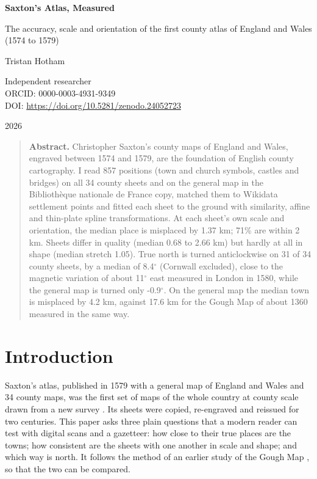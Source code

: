 \documentclass[11pt,a4paper]{article}
\begin{document}
\begin{center}
{\Large\bfseries Saxton's Atlas, Measured\par}
\vspace{0.4em}
{\large The accuracy, scale and orientation of the first county atlas of England and Wales (1574 to 1579)\par}
\vspace{1.2em}
{\large Tristan Hotham\par}
\vspace{0.3em}
{\small Independent researcher\\ ORCID: 0000-0003-4931-9349\\ DOI: \url{https://doi.org/10.5281/zenodo.24052723}\par}
\vspace{0.8em}
2026
\end{center}
\begin{quote}\small\textbf{Abstract.} Christopher Saxton's county maps of England and Wales, engraved between 1574 and 1579, are the foundation of English county cartography. I read 857 positions (town and church symbols, castles and bridges) on all 34 county sheets and on the general map in the Biblioth\`eque nationale de France copy, matched them to Wikidata settlement points and fitted each sheet to the ground with similarity, affine and thin-plate spline transformations. At each sheet's own scale and orientation, the median place is misplaced by 1.37 km; 71\% are within 2 km. Sheets differ in quality (median 0.68 to 2.66 km) but hardly at all in shape (median stretch 1.05). True north is turned anticlockwise on 31 of 34 county sheets, by a median of 8.4$^\circ$ (Cornwall excluded), close to the magnetic variation of about 11\textonequarter$^\circ$ east measured in London in 1580, while the general map is turned only -0.9$^\circ$. On the general map the median town is misplaced by 4.2 km, against 17.6 km for the Gough Map of about 1360 measured in the same way.\end{quote}

\section{Introduction}
Saxton's atlas, published in 1579 with a general map of England and Wales and 34 county maps, was the first set of maps of the whole country at county scale drawn from a new survey \citep{evans}. Its sheets were copied, re-engraved and reissued for two centuries. This paper asks three plain questions that a modern reader can test with digital scans and a gazetteer: how close to their true places are the towns; how consistent are the sheets with one another in scale and shape; and which way is north. It follows the method of an earlier study of the Gough Map \citep{gough}, so that the two can be compared.
\end{document}
